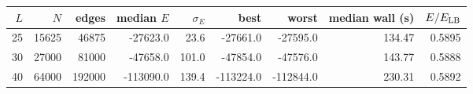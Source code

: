 \begin{tabular}{rrrrrrrrr}
\toprule
$L$ & $N$ & edges & median $E$ & $\sigma_E$ & best & worst & median wall (s) & $E/E_{\rm LB}$ \\
\midrule
25 & 15625 & 46875 & -27623.0 & 23.6 & -27661.0 & -27595.0 & 134.47 & 0.5895 \\
30 & 27000 & 81000 & -47658.0 & 101.0 & -47854.0 & -47576.0 & 143.77 & 0.5888 \\
40 & 64000 & 192000 & -113090.0 & 139.4 & -113224.0 & -112844.0 & 230.31 & 0.5892 \\
\bottomrule
\end{tabular}
